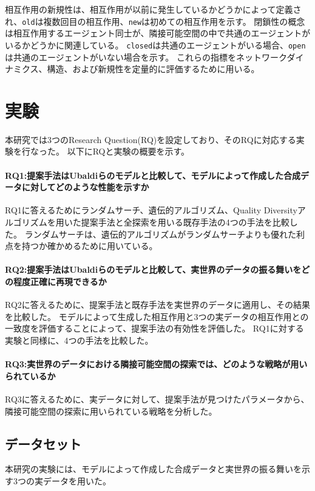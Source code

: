 \documentclass[uplatex,11pt,openany]{ujreport}
\begin{document}
        相互作用の新規性は、相互作用が以前に発生しているかどうかによって定義され、\verb|old|は複数回目の相互作用、\verb|new|は初めての相互作用を示す。
        閉鎖性の概念は相互作用するエージェント同士が、隣接可能空間の中で共通のエージェントがいるかどうかに関連している。
        \verb|closed|は共通のエージェントがいる場合、\verb|open|は共通のエージェントがいない場合を示す。
        これらの指標をネットワークダイナミクス、構造、および新規性を定量的に評価するために用いる。


\chapter{実験}
    本研究では3つのResearch Question(RQ)を設定しており、そのRQに対応する実験を行なった。
    以下にRQと実験の概要を示す。
        \subsubsection*{RQ1:提案手法はUbaldiらのモデルと比較して、モデルによって作成した合成データに対してどのような性能を示すか}
            RQ1に答えるためにランダムサーチ、遺伝的アルゴリズム、Quality Diversityアルゴリズムを用いた提案手法と全探索を用いる既存手法の4つの手法を比較した。
            ランダムサーチは、遺伝的アルゴリズムがランダムサーチよりも優れた利点を持つか確かめるために用いている。
        \subsubsection*{RQ2:提案手法はUbaldiらのモデルと比較して、実世界のデータの振る舞いをどの程度正確に再現できるか}
            RQ2に答えるために、提案手法と既存手法を実世界のデータに適用し、その結果を比較した。
            モデルによって生成した相互作用と3つの実データの相互作用との一致度を評価することによって、提案手法の有効性を評価した。
            RQ1に対する実験と同様に、4つの手法を比較した。
        \subsubsection*{RQ3:実世界のデータにおける隣接可能空間の探索では、どのような戦略が用いられているか}
            RQ3に答えるために、実データに対して、提案手法が見つけたパラメータから、隣接可能空間の探索に用いられている戦略を分析した。

    \section{データセット}
        本研究の実験には、モデルによって作成した合成データと実世界の振る舞いを示す3つの実データを用いた。
\end{document}

